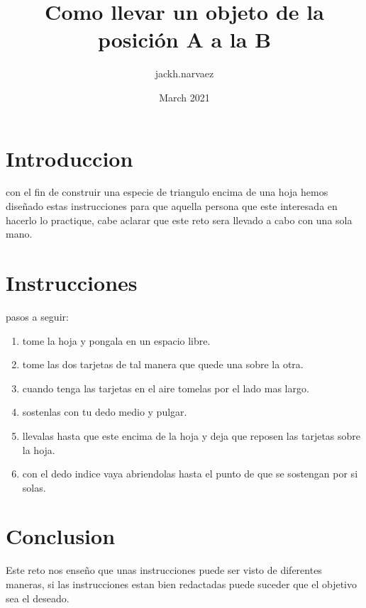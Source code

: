 \documentclass{article}
\title{Como llevar un objeto de la posición A a la B}
\author{jackh.narvaez }
\date{March 2021}
\begin{document}
\maketitle

\section{Introduccion}
con el fin de construir una especie de triangulo encima de una hoja hemos diseñado estas instrucciones para que aquella persona que este interesada en hacerlo lo practique, cabe aclarar que este reto sera llevado a cabo con una sola mano.

\section{Instrucciones}
pasos a seguir:
\begin{enumerate}
    \item tome la hoja y pongala en un espacio libre.  
    \item tome las dos tarjetas de tal manera que quede una sobre la otra. 
    \item cuando tenga las tarjetas en el aire tomelas por el lado mas largo.
    \item  sostenlas con tu dedo medio y pulgar.
    \item  llevalas hasta que este encima de la hoja y deja que reposen  las tarjetas sobre la hoja. 
    \item  con el dedo indice vaya abriendolas hasta el punto de que se sostengan por si solas.
\end{enumerate}

\section{Conclusion}
Este reto nos enseño que unas instrucciones puede ser visto de diferentes maneras, si las instrucciones estan bien redactadas puede suceder que el objetivo sea el deseado. 
\end{document}
